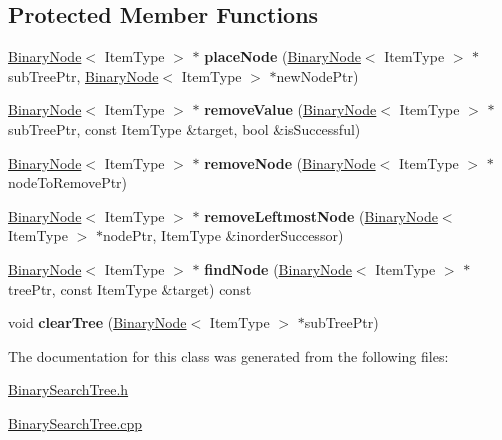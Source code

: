 \subsection*{Protected Member Functions}
\begin{DoxyCompactItemize}
\item 
\hypertarget{class_binary_search_tree_abd1859220c1ba567bb1ff566e1eeacd9}{}\label{class_binary_search_tree_abd1859220c1ba567bb1ff566e1eeacd9} 
\hyperlink{class_binary_node}{Binary\+Node}$<$ Item\+Type $>$ $\ast$ {\bfseries place\+Node} (\hyperlink{class_binary_node}{Binary\+Node}$<$ Item\+Type $>$ $\ast$sub\+Tree\+Ptr, \hyperlink{class_binary_node}{Binary\+Node}$<$ Item\+Type $>$ $\ast$new\+Node\+Ptr)
\item 
\hypertarget{class_binary_search_tree_a60a411ec64c72701c33325e78d55ba11}{}\label{class_binary_search_tree_a60a411ec64c72701c33325e78d55ba11} 
\hyperlink{class_binary_node}{Binary\+Node}$<$ Item\+Type $>$ $\ast$ {\bfseries remove\+Value} (\hyperlink{class_binary_node}{Binary\+Node}$<$ Item\+Type $>$ $\ast$sub\+Tree\+Ptr, const Item\+Type \&target, bool \&is\+Successful)
\item 
\hypertarget{class_binary_search_tree_a3a78640dd0d8e2658eeba619ef5d9851}{}\label{class_binary_search_tree_a3a78640dd0d8e2658eeba619ef5d9851} 
\hyperlink{class_binary_node}{Binary\+Node}$<$ Item\+Type $>$ $\ast$ {\bfseries remove\+Node} (\hyperlink{class_binary_node}{Binary\+Node}$<$ Item\+Type $>$ $\ast$node\+To\+Remove\+Ptr)
\item 
\hypertarget{class_binary_search_tree_a0cc4ccebb32f56016905e9eb76d21f27}{}\label{class_binary_search_tree_a0cc4ccebb32f56016905e9eb76d21f27} 
\hyperlink{class_binary_node}{Binary\+Node}$<$ Item\+Type $>$ $\ast$ {\bfseries remove\+Leftmost\+Node} (\hyperlink{class_binary_node}{Binary\+Node}$<$ Item\+Type $>$ $\ast$node\+Ptr, Item\+Type \&inorder\+Successor)
\item 
\hypertarget{class_binary_search_tree_a91096bb57439c2551bc65de4f441b13d}{}\label{class_binary_search_tree_a91096bb57439c2551bc65de4f441b13d} 
\hyperlink{class_binary_node}{Binary\+Node}$<$ Item\+Type $>$ $\ast$ {\bfseries find\+Node} (\hyperlink{class_binary_node}{Binary\+Node}$<$ Item\+Type $>$ $\ast$tree\+Ptr, const Item\+Type \&target) const
\item 
\hypertarget{class_binary_search_tree_ad98b67dc1e47557e51cc5553ab3f2d25}{}\label{class_binary_search_tree_ad98b67dc1e47557e51cc5553ab3f2d25} 
void {\bfseries clear\+Tree} (\hyperlink{class_binary_node}{Binary\+Node}$<$ Item\+Type $>$ $\ast$sub\+Tree\+Ptr)
\end{DoxyCompactItemize}


The documentation for this class was generated from the following files\+:\begin{DoxyCompactItemize}
\item 
\hyperlink{_binary_search_tree_8h}{Binary\+Search\+Tree.\+h}\item 
\hyperlink{_binary_search_tree_8cpp}{Binary\+Search\+Tree.\+cpp}\end{DoxyCompactItemize}
